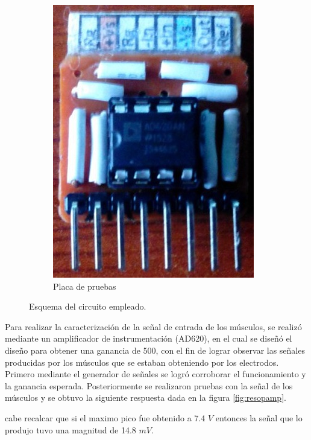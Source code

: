 \begin{figure}[H]
\begin{subfigure}{.4\textwidth}
  \includegraphics[width=.8\linewidth]{Capitulo_1/placa.jpg}
  \caption{Placa de pruebas}
  \label{fig:placa}
\end{subfigure}
\caption{Esquema del circuito empleado.}
\label{fig:esquema}
\end{figure}

Para realizar la caracterización de la señal de entrada de los músculos, se realizó mediante un amplificador de instrumentación (AD620), en el cual se diseñó el diseño para obtener una ganancia de 500, con el fin de lograr observar las señales producidas por los músculos que se estaban obteniendo por los electrodos. Primero mediante el generador de señales se logró corroborar el funcionamiento y la ganancia esperada. Posteriormente se realizaron pruebas con la señal de los músculos y se obtuvo la siguiente respuesta dada en la figura \ref{fig:resopamp}.

cabe recalcar que si el maximo pico fue obtenido a 7.4 $V$ entonces la señal que lo produjo tuvo una magnitud de 14.8 $mV$. 

